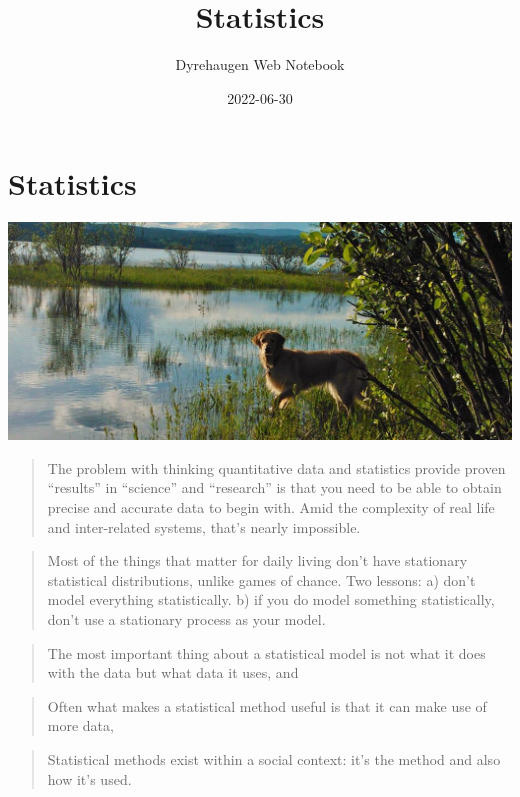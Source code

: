 \documentclass[
]{book}
\title{Statistics}
\author{Dyrehaugen Web Notebook}
\date{2022-06-30}
\begin{document}
\maketitle

{
\setcounter{tocdepth}{1}
\tableofcontents
}
\hypertarget{statistics}{%
\chapter{Statistics}\label{statistics}}

\includegraphics{fig/zelda.jpg}

\begin{quote}
The problem with thinking quantitative data and statistics provide proven ``results'' in ``science'' and ``research'' is that you need to be able to obtain precise and accurate data to begin with.
Amid the complexity of real life and inter-related systems, that's nearly impossible.
\end{quote}

\begin{quote}
Most of the things that matter for daily living don't have stationary statistical distributions, unlike games of chance.
Two lessons:
a) don't model everything statistically.
b) if you do model something statistically, don't use a stationary process as your model.
\end{quote}

\begin{quote}
The most important thing about a statistical model is not what it does with the data but what data it uses, and
\end{quote}

\begin{quote}
Often what makes a statistical method useful is that it can make use of more data,
\end{quote}

\begin{quote}
Statistical methods exist within a social context: it's the method and also how it's used.
\end{quote}
\end{document}
